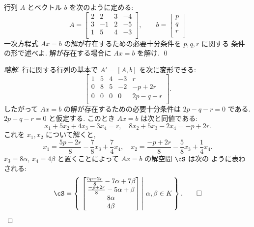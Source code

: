 \documentclass[12pt,twoside]{jarticle}
\newcommand\commentout[1]{#1}
\newcommand\commentout[1]{}
\begin{document}
\begin{question}[5点]
  \label{q:sol-inhom-2}
  行列 $A$ とベクトル $b$ を次のように定める:
  \begin{equation*}
    A = 
    \begin{bmatrix}
      2 &  2 & 3 & -4 \\
      3 & -1 & 2 & -5 \\
      1 &  5 & 4 & -3 \\
    \end{bmatrix},
    \qquad
    b =
    \begin{bmatrix}
      p \\
      q \\
      r \\
    \end{bmatrix}
  \end{equation*}
  一次方程式 $Ax=b$ の解が存在するための必要十分条件を $p,q,r$ に関する
  条件の形で述べよ.  解が存在する場合に $Ax=b$ を解け. \qed
\end{question}

\commentout{
\begin{proof}[略解]
  行に関する行列の基本で $A'=[A,b]$ を次に変形できる:
  \begin{equation*}
    \left[
      \begin{array}{cccc|c}
        1 & 5 & 4 & -3 &          r \\
        0 & 8 & 5 & -2 & -p     +2r \\
        0 & 0 & 0 &  0 & 2p - q - r \\
      \end{array}
    \right].
  \end{equation*}
  したがって $Ax=b$ の解が存在するための必要十分条件は $2p-q-r=0$ である.
  $2p-q-r=0$ と仮定する. このとき $Ax=b$ は次と同値である:
  \begin{equation*}
    x_1 + 5x_2 + 4x_3 -3x_4 = r,
    \quad
          8x_2 + 5x_3 -2x_4 = -p+2r.
  \end{equation*}
  これを $x_1,x_2$ について解くと,
  \begin{equation*}
    x_1 = \frac{5p-2r}{8} - \frac{7}{8}x_3 + \frac{7}{4}x_4,
    \quad
    x_2 = \frac{-p+2r}{8} - \frac{5}{8}x_3 + \frac{1}{4}x_4.
  \end{equation*}
  $x_3=8\alpha$, $x_4=4\beta$ と置くことによって $Ax=b$ の解空間 $\cS$ は次の
  ように表わされる:
  \begin{equation*}
    \cS =
    \left\{\,
      \left.
        \begin{bmatrix}
          \frac{5p-2r}{8} - 7\alpha + 7\beta \\
          \frac{-p+2r}{8} - 5\alpha +  \beta \\
          8\alpha \\
          4\beta \\
        \end{bmatrix}
      \,\right|\,
      \alpha,\beta\in K
    \,\right\}.
    \qed
  \end{equation*}
\end{proof}
}
\end{document}

